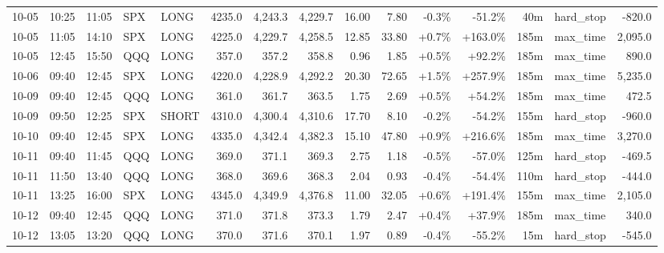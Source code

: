 \documentclass[11pt,a4paper,twoside]{article}
\begin{document}
\begin{landscape}
\begin{center}
\begin{longtable}{>{\color{txtmain}}l l l l l r r r r r r r r >{\color{txtmain}}l r}
10-05 & 10:25 & 11:05 & SPX & LONG & 4235.0 & 4,243.3 & 4,229.7 & 16.00 & 7.80 & \textcolor{lossred}{-0.3\%} & \textcolor{lossred}{-51.2\%} & 40m & hard\_stop & \textcolor{lossred}{-820.0} \\
10-05 & 11:05 & 14:10 & SPX & LONG & 4225.0 & 4,229.7 & 4,258.5 & 12.85 & 33.80 & \textcolor{wingreen}{+0.7\%} & \textcolor{wingreen}{+163.0\%} & 185m & max\_time & \textcolor{wingreen}{2,095.0} \\
10-05 & 12:45 & 15:50 & QQQ & LONG & 357.0 & 357.2 & 358.8 & 0.96 & 1.85 & \textcolor{wingreen}{+0.5\%} & \textcolor{wingreen}{+92.2\%} & 185m & max\_time & \textcolor{wingreen}{890.0} \\
10-06 & 09:40 & 12:45 & SPX & LONG & 4220.0 & 4,228.9 & 4,292.2 & 20.30 & 72.65 & \textcolor{wingreen}{+1.5\%} & \textcolor{wingreen}{+257.9\%} & 185m & max\_time & \textcolor{wingreen}{5,235.0} \\
10-09 & 09:40 & 12:45 & QQQ & LONG & 361.0 & 361.7 & 363.5 & 1.75 & 2.69 & \textcolor{wingreen}{+0.5\%} & \textcolor{wingreen}{+54.2\%} & 185m & max\_time & \textcolor{wingreen}{472.5} \\
10-09 & 09:50 & 12:25 & SPX & SHORT & 4310.0 & 4,300.4 & 4,310.6 & 17.70 & 8.10 & \textcolor{lossred}{-0.2\%} & \textcolor{lossred}{-54.2\%} & 155m & hard\_stop & \textcolor{lossred}{-960.0} \\
10-10 & 09:40 & 12:45 & SPX & LONG & 4335.0 & 4,342.4 & 4,382.3 & 15.10 & 47.80 & \textcolor{wingreen}{+0.9\%} & \textcolor{wingreen}{+216.6\%} & 185m & max\_time & \textcolor{wingreen}{3,270.0} \\
10-11 & 09:40 & 11:45 & QQQ & LONG & 369.0 & 371.1 & 369.3 & 2.75 & 1.18 & \textcolor{lossred}{-0.5\%} & \textcolor{lossred}{-57.0\%} & 125m & hard\_stop & \textcolor{lossred}{-469.5} \\
10-11 & 11:50 & 13:40 & QQQ & LONG & 368.0 & 369.6 & 368.3 & 2.04 & 0.93 & \textcolor{lossred}{-0.4\%} & \textcolor{lossred}{-54.4\%} & 110m & hard\_stop & \textcolor{lossred}{-444.0} \\
10-11 & 13:25 & 16:00 & SPX & LONG & 4345.0 & 4,349.9 & 4,376.8 & 11.00 & 32.05 & \textcolor{wingreen}{+0.6\%} & \textcolor{wingreen}{+191.4\%} & 155m & max\_time & \textcolor{wingreen}{2,105.0} \\
10-12 & 09:40 & 12:45 & QQQ & LONG & 371.0 & 371.8 & 373.3 & 1.79 & 2.47 & \textcolor{wingreen}{+0.4\%} & \textcolor{wingreen}{+37.9\%} & 185m & max\_time & \textcolor{wingreen}{340.0} \\
10-12 & 13:05 & 13:20 & QQQ & LONG & 370.0 & 371.6 & 370.1 & 1.97 & 0.89 & \textcolor{lossred}{-0.4\%} & \textcolor{lossred}{-55.2\%} & 15m & hard\_stop & \textcolor{lossred}{-545.0} \\

\end{longtable}
\end{center}
\end{landscape}
\end{document}
